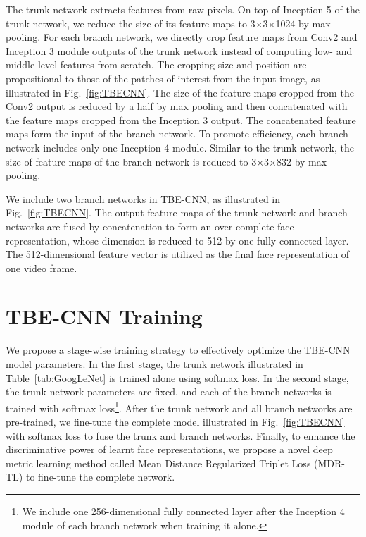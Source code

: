 \documentclass[10pt,journal,cspaper,compsoc]{IEEEtran}
\begin{document}
The trunk network extracts features from raw pixels.
On top of Inception 5 of the trunk network, we reduce the size of its feature maps to 3$\times$3$\times$1024 by max pooling.
For each branch network,
we directly crop feature maps from Conv2 and Inception 3 module outputs of the trunk network instead of computing low- and middle-level features from scratch.
The cropping size and position are propositional to those of the patches of interest from the input image, as illustrated in Fig.~\ref{fig:TBECNN}.
The size of the feature maps cropped from the Conv2 output is reduced by a half by max pooling
and then concatenated with the feature maps cropped from the Inception 3 output.
The concatenated feature maps form the input of the branch network.
To promote efficiency, each branch network includes only one Inception 4 module.
Similar to the trunk network, the size of feature maps of the branch network is reduced to 3$\times$3$\times$832 by max pooling.

We include two branch networks in TBE-CNN, as illustrated in Fig.~\ref{fig:TBECNN}.
The output feature maps of the trunk network and branch networks are fused by concatenation to form an over-complete face representation,
whose dimension is reduced to 512 by one fully connected layer.
The 512-dimensional feature vector is utilized as the final face representation of one video frame.



\section{TBE-CNN Training}
\label{Sec:Training}
We propose a stage-wise training strategy to effectively optimize the TBE-CNN model parameters.
In the first stage, the trunk network illustrated in Table~\ref{tab:GoogLeNet} is trained alone using softmax loss.
In the second stage, the trunk network parameters are fixed, and each of the branch networks is trained with softmax loss\footnote{
We include one 256-dimensional fully connected layer after the Inception 4 module of each branch network when training it alone.}.
After the trunk network and all branch networks are pre-trained, we fine-tune the complete model illustrated in Fig.~\ref{fig:TBECNN} with softmax loss to fuse the trunk and branch networks.
Finally, to enhance the discriminative power of learnt face representations,
we propose a novel deep metric learning method called Mean Distance Regularized Triplet Loss (MDR-TL) to fine-tune the complete network.
\end{document}
